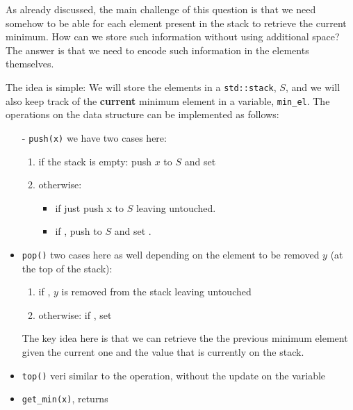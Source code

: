 As already discussed, the main challenge of this question is that we need somehow to be able for each element present in the stack to retrieve the current minimum. How can we store such information without using additional space? The answer is that we need to encode such information  in the elements themselves. 

The idea is simple: We will store the elements in a \lstinline[columns=fixed]{std::stack}, $S$, and we will also keep track of the \textbf{current} minimum element in a variable, \lstinline[columns=fixed]{min_el}. The operations on the data structure can be implemented as follows:

\begin{itemize}
	\item[-]\lstinline[columns=fixed]{push(x)} we have two cases here:
		\begin{enumerate}
			\item if the stack is empty: push $x$ to $S$ and set 
			\item otherwise: 
			\begin{itemize}
					\item if  just push x to $S$ leaving  untouched. 
					\item if , push  to $S$ and set  .
			\end{itemize}
		\end{enumerate}
	\item[-]\lstinline[columns=fixed]{pop()} two cases here as well depending on the element to be removed $y$ (at the top of the stack):
		\begin{enumerate}
			\item if , $y$ is removed from the stack leaving  untouched
			\item otherwise: if , set 			
		\end{enumerate} 
		The key idea  here is that we can  retrieve the the previous minimum element given the current one and the value that is currently on the stack. 
	\item[-]\lstinline[columns=fixed]{top()} veri similar to the  operation, without the update on the variable  
	\item[-]\lstinline[columns=fixed]{get_min(x)}, returns 
\end{itemize}

